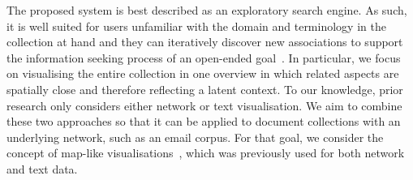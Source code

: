 The proposed system is best described as an exploratory search engine.
As such, it is well suited for users unfamiliar with the domain and terminology in the collection at hand and they can iteratively discover new associations to support the information seeking process of an open-ended goal~\cite{white2009exploratory}.
In particular, we focus on visualising the entire collection in one overview in which related aspects are spatially close and therefore reflecting a latent context.
To our knowledge, prior research only considers either network or text visualisation.
We aim to combine these two approaches so that it can be applied to document collections with an underlying network, such as an email corpus.
For that goal, we consider the concept of map-like visualisations~\cite{pang2017creating}, which was previously used for both network and text data.

